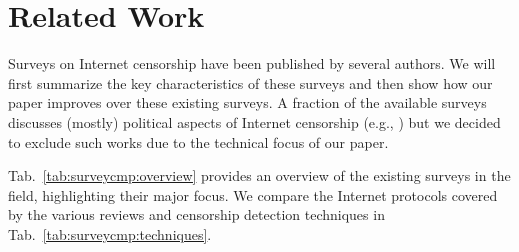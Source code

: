 \section{Related Work}
\label{sect:relwrk}
Surveys on Internet censorship have been published by several authors. We will first summarize the key characteristics of these surveys and then show how our paper improves over these existing surveys.
A fraction of the available surveys discusses (mostly) political aspects of Internet censorship (e.g., \cite{Zuchora2010,bitso2013trends}) but we decided to exclude such works due to the technical focus of our paper.

Tab.~\ref{tab:surveycmp:overview} provides an overview of the existing surveys in the field, highlighting their major focus. We compare the Internet protocols covered by the various reviews and censorship detection techniques in Tab.~\ref{tab:surveycmp:techniques}. 


